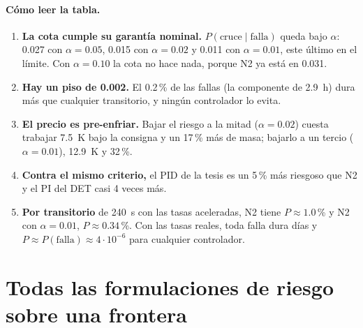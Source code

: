 \paragraph{Cómo leer la tabla.}
\begin{enumerate}
  \item \textbf{La cota cumple su garantía nominal.} $P(\text{cruce}\mid\text{falla})$ queda bajo
        $\alpha$: 0.027 con $\alpha=0.05$, 0.015 con $\alpha=0.02$ y 0.011 con $\alpha=0.01$, este
        último en el límite. Con $\alpha=0.10$ la cota no hace nada, porque N2 ya está en 0.031.
  \item \textbf{Hay un piso de 0.002.} El 0.2\,\% de las fallas (la componente de 2.9~h) dura
        más que cualquier transitorio, y ningún controlador lo evita.
  \item \textbf{El precio es pre-enfriar.} Bajar el riesgo a la mitad ($\alpha=0.02$) cuesta
        trabajar 7.5~K bajo la consigna y un 17\,\% más de masa; bajarlo a un tercio
        ($\alpha=0.01$), 12.9~K y 32\,\%.
  \item \textbf{Contra el mismo criterio,} el PID de la tesis es un 5\,\% más riesgoso que N2 y
        el PI del DET casi 4 veces más.
  \item \textbf{Por transitorio} de 240~s con las tasas aceleradas, N2 tiene $P\approx1.0$\,\% y
        N2 con $\alpha=0.01$, $P\approx0.34$\,\%. Con las tasas reales, toda falla dura días y
        $P\approx P(\text{falla})\approx4\cdot10^{-6}$ para cualquier controlador.
\end{enumerate}


\section{Todas las formulaciones de riesgo sobre una frontera}\label{sec:riesgo-formulaciones}
